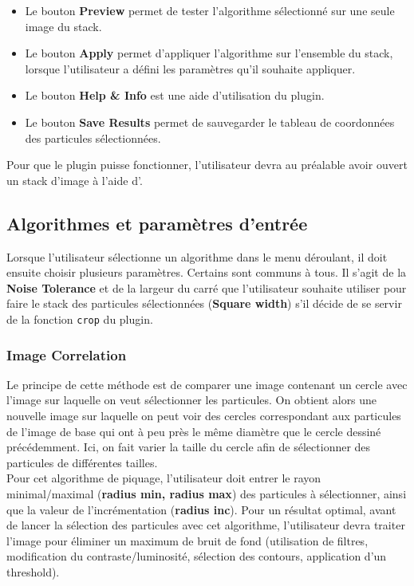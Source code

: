 \documentclass[12pt,a4paper]{report}
\begin{document}
\begin{itemize}
\item Le bouton \textbf{Preview} permet de tester l'algorithme sélectionné sur une seule image du stack.
\item Le bouton \textbf{Apply} permet d'appliquer l'algorithme sur l'ensemble du stack, lorsque l'utilisateur a défini les paramètres qu'il souhaite appliquer.
\item Le bouton \textbf{Help \& Info} est une aide d'utilisation du plugin.
\item Le bouton \textbf{Save Results} permet de sauvegarder le tableau de coordonnées des particules sélectionnées.%
\end{itemize}
Pour que le plugin puisse fonctionner, l'utilisateur devra au préalable avoir ouvert un stack d'image à l'aide d'\imj.

\subsection{Algorithmes et paramètres d'entrée}

Lorsque l'utilisateur sélectionne un algorithme dans le menu déroulant, il doit ensuite choisir plusieurs paramètres.
Certains sont communs à tous. Il s'agit de la \textbf{Noise Tolerance} et de la largeur du carré que l'utilisateur souhaite utiliser pour faire le stack des particules sélectionnées (\textbf{Square width}) s'il décide de se servir de la fonction \texttt{crop} du plugin.

\subsubsection{Image Correlation}

Le principe de cette méthode est de comparer une image contenant un cercle avec l'image sur laquelle on veut sélectionner les particules. On obtient alors une nouvelle image sur laquelle on peut voir des cercles correspondant aux particules de l'image de base qui ont à peu près le même diamètre que le cercle dessiné précédemment. Ici, on fait varier la taille du cercle afin de sélectionner des particules de différentes tailles.\\
\noindent
Pour cet algorithme de piquage, l'utilisateur doit entrer le rayon minimal/maximal (\textbf{radius min, radius max}) des particules à sélectionner, ainsi que la valeur de l'incrémentation (\textbf{radius inc}). Pour un résultat optimal, avant de lancer la sélection des particules avec cet algorithme, l'utilisateur devra traiter l'image pour éliminer un maximum de bruit de fond (utilisation de filtres, modification du contraste/luminosité, sélection des contours, application d'un threshold).
\end{document}
